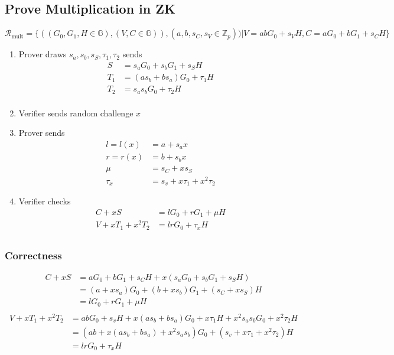 \subsection{Prove Multiplication in ZK}

\begin{equation*}
  \mathcal{R}_{\textrm{mult}} = \{ ((G_0, G_1, H \in \mathbb{G}), (V, C \in \mathbb{G})) , (a, b, s_C, s_V \in \mathbb{Z}_p))  | V = abG_0 + s_VH, C = aG_0 + bG_1 + s_CH\}
\end{equation*}

\begin{enumerate}
\item Prover draws $s_a, s_b, s_S, \tau_1, \tau_2$ sends
  \begin{align*}
    S &= s_aG_0 + s_b G_1 + s_S H\\
    T_1 &= (as_b + bs_a)G_0 + \tau_1H\\
    T_2 &= s_as_bG_0 + \tau_2H\\
  \end{align*}
  \item Verifier sends random challenge $x$
  \item Prover sends
  \begin{align*}
    l = l(x) &= a + s_ax\\
    r = r(x) &= b + s_bx\\
    \mu &= s_C + xs_S\\
    \tau_x &= s_v + x\tau_1 + x^2\tau_2
  \end{align*}
  \item Verifier checks
    \begin{align*}
      C + xS &= lG_0 + rG_1 + \mu H\\
      V + xT_1 + x^2T_2 &= lrG_0 + \tau_x H \\
    \end{align*}
\end{enumerate}

\subsubsection{Correctness}
\begin{align*}
  C + xS &= aG_0 + bG_1 + s_CH + x(s_aG_0 + s_b G_1 + s_SH)\\
         &= (a + xs_a)G_0 + (b + xs_b)G_1 + (s_C + xs_S)H\\
         &= lG_0 + rG_1 + \mu H\\
\end{align*}
\begin{align*}
  V + xT_1 + x^2T_2 &= abG_0 + s_vH+ x(as_b + bs_a)G_0 + x\tau_1H + x^2s_as_bG_0 + x^2\tau_2H\\
                    &= (ab + x(as_b + bs_a) + x^2s_as_b)G_0 + (s_v + x\tau_1 + x^2\tau_2)H\\
                    &= lrG_0 + \tau_xH
\end{align*}

